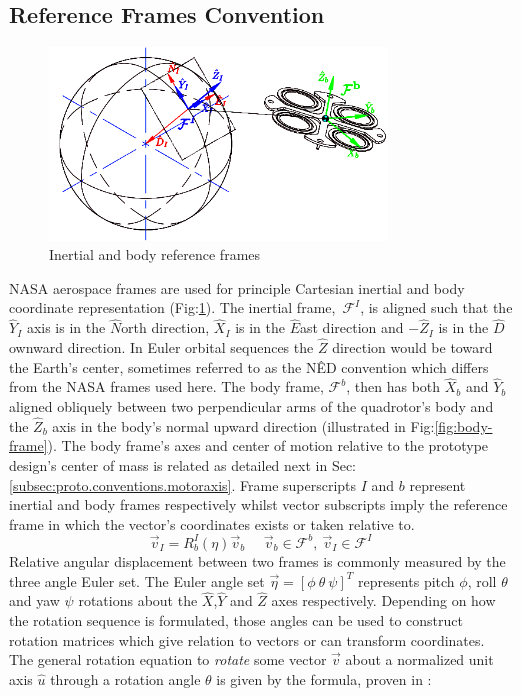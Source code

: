 \subsection{Reference Frames Convention}
\label{subsec:proto.conventions.frames}
\begin{figure}[htbp]
\centering
\includegraphics[width=0.8\textwidth]{figs/reference-frame}
\caption{Inertial and body reference frames}
\label{fig:ref_frame}
\end{figure}
NASA aerospace frames are used for principle Cartesian inertial and body coordinate representation (Fig:\ref{fig:ref_frame}). The inertial frame,~$\mathcal{F}^I$, is aligned such that the $\hat{Y}_I$ axis is in the $\hat{N}$orth direction, $\hat{X}_I$ is in the $\hat{E}$ast direction and $-\hat{Z}_I$ is  in the $\hat{D}$ownward direction. In Euler orbital sequences the $\hat{Z}$ direction would be toward the Earth's center, sometimes referred to as the N\^{E}D convention which differs from the NASA frames used here. The body frame, $\mathcal{F}^b$, then has both $\hat{X}_b$ and $\hat{Y}_b$ aligned obliquely between two perpendicular arms of the quadrotor's body and the $\hat{Z}_b$ axis in the body's normal upward direction (illustrated in Fig:\ref{fig:body-frame}). The body frame's axes and center of motion relative to the prototype design's center of mass is related as detailed next in Sec:\ref{subsec:proto.conventions.motoraxis}. Frame superscripts $I$ and $b$ represent inertial and body frames respectively whilst vector subscripts imply the reference frame in which the vector's coordinates exists or taken relative to. 
\begin{equation}
\vec{v}_I=R_b^I(\eta)\vec{v}_b~~~~~~\vec{v}_b\in\mathcal{F}^b,~\vec{v}_I\in\mathcal{F}^I
\end{equation}
Relative angular displacement between two frames is commonly measured by the three angle Euler set. The Euler angle set $\vec{\eta}=[\phi ~\theta ~\psi]^T$ represents pitch $\phi$, roll $\theta$ and yaw $\psi$ rotations about the $\hat{X}$,$\hat{Y}$ and $\hat{Z}$ axes respectively. Depending on how the rotation sequence is formulated, those angles can be used to construct rotation matrices which give relation to vectors or can transform coordinates. The general rotation equation to \emph{rotate} some vector $\vec{v}$ about a normalized unit axis $\hat{u}$ through a rotation angle $\theta$ is given by the formula, proven in \cite{quaddynamics}:
